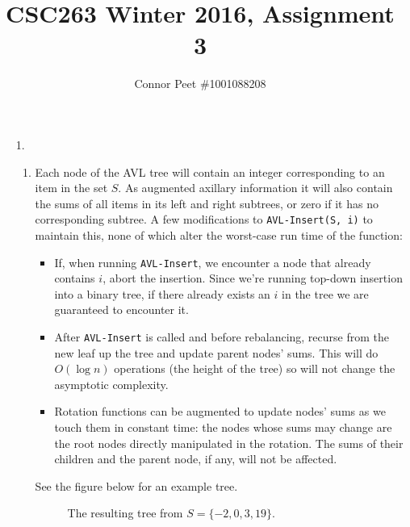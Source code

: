 \documentclass{article}
\title{CSC263 Winter 2016, Assignment 3}
\author{Connor Peet \#1001088208}
\begin{document}
\maketitle

\lstset{
    numbers=left
}

\begin{enumerate}
\item [1.]
    \begin{enumerate}
    \item Each node of the AVL tree will contain an integer corresponding to an item in the set $S$. As augmented axillary information it will also contain the sums of all items in its left and right subtrees, or zero if it has no corresponding subtree. A few modifications to \texttt{AVL-Insert(S, i)} to maintain this, none of which alter the worst-case run time of the function:
        \begin{itemize}
        \item If, when running \texttt{AVL-Insert}, we encounter a node that already contains $i$, abort the insertion. Since we're running top-down insertion into a binary tree, if there already exists an $i$ in the tree we are guaranteed to encounter it.
        \item After \texttt{AVL-Insert} is called and before rebalancing, recurse from the new leaf up the tree and update parent nodes' sums. This will do $O(\log n)$ operations (the height of the tree) so will not change the asymptotic complexity.
        \item Rotation functions can be augmented to update nodes' sums as we touch them in constant time: the nodes whose sums may change are the root nodes directly manipulated in the rotation. The sums of their children and the parent node, if any, will not be affected.
        \end{itemize}
    See the figure below for an example tree.

    \begin{figure}[h]
    \centering
    \caption{The resulting tree from $S = \{-2, 0, 3, 19\}$.}
    \end{figure}


\end{enumerate}
\end{enumerate}
\end{document}
